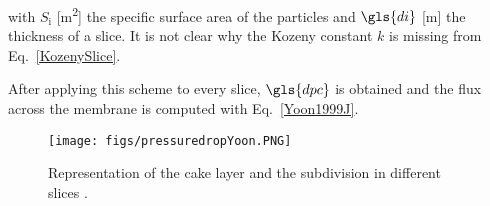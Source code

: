 with $S_\mathrm{i}$ [\unit{\metre\squared}] the specific surface area of the particles and $\gls{di}$ [\unit{\metre}] the thickness of a slice. It is not clear why the Kozeny constant $k$ is missing from Eq.\ \eqref{KozenySlice}. \par
After applying this scheme to every slice, $\gls{dpc}$ is obtained and the flux across the membrane is computed with Eq.\ \eqref{Yoon1999J}.
\begin{figure}[H]
\begin{center}
\hspace{-1.5cm}
\texttt{[image: figs/pressuredropYoon.PNG]}
\caption{Representation of the cake layer and the subdivision in different slices \cite{Yoon1999}.\label{YoonSlice}}
\end{center}
\end{figure}

